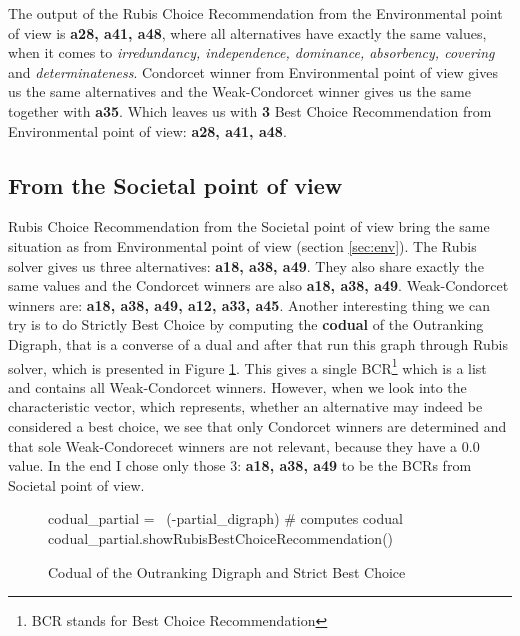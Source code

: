 \documentclass[a4paper]{article}
\begin{document}
The output of the Rubis Choice Recommendation from the Environmental point of view is \textbf{a28, a41, a48}, where all alternatives have exactly the same values, when it comes to \emph{irredundancy, independence, dominance, absorbency, covering} and \emph{determinateness}. Condorcet winner from Environmental point of view gives us the same alternatives and the Weak-Condorcet winner gives us the same together with \textbf{a35}. Which leaves us with \textbf{3} Best Choice Recommendation from Environmental point of view: \textbf{a28, a41, a48}.

\subsection{From the Societal point of view}

Rubis Choice Recommendation from the Societal point of view bring the same situation as from Environmental point of view (section \ref*{sec:env}). The Rubis solver gives us three alternatives: \textbf{a18, a38, a49}. They also share exactly the same values and the Condorcet winners are also \textbf{a18, a38, a49}. Weak-Condorcet winners are: \textbf{a18, a38, a49, a12, a33, a45}. Another interesting thing we can try is to do Strictly Best Choice by computing the \textbf{codual} of the Outranking Digraph, that is a converse of a dual and after that run this graph through Rubis solver, which is presented in Figure \ref{lst:strict}. This gives a single BCR\footnote{BCR stands for Best Choice Recommendation} which is a list and contains all Weak-Condorcet winners. However, when we look into the characteristic vector, which represents, whether an alternative may indeed be considered a best choice, we see that only Condorcet winners are determined and that sole Weak-Condorecet winners are not relevant, because they have a 0.0 value. In the end I chose only those 3: \textbf{a18, a38, a49} to be the BCRs from Societal point of view. 

\begin{figure}[H]
	\begin{center}
		\begin{python}
codual_partial = ~(-partial_digraph)                  # computes codual
codual_partial.showRubisBestChoiceRecommendation()
		\end{python}
	\end{center}
	\caption{Codual of the Outranking Digraph and Strict Best Choice}
	\label{lst:strict}
\end{figure}
\end{document}
